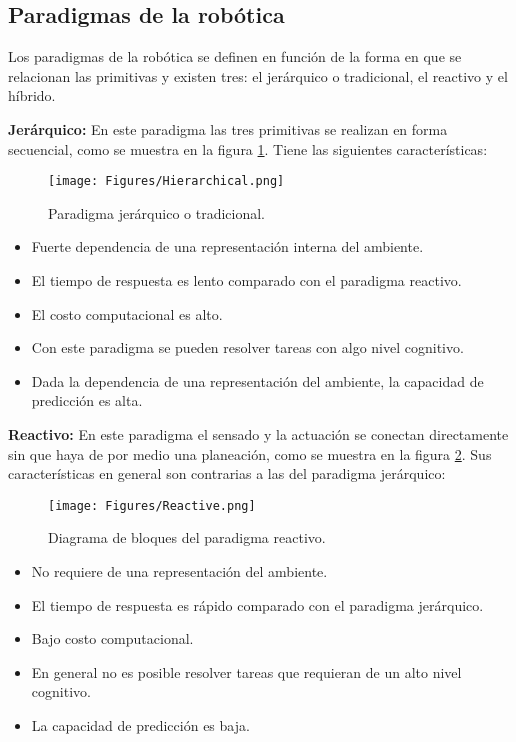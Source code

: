 \documentclass[a4paper]{article}
\begin{document}
\subsection{Paradigmas de la robótica}
Los paradigmas de la robótica se definen en función de la forma en que se relacionan las primitivas y existen tres: el jerárquico o tradicional, el reactivo y el híbrido. 

\textbf{Jerárquico:} En este paradigma las tres primitivas se realizan en forma secuencial, como se muestra en la figura  \ref{fig:ParadigmHierarchical}. Tiene las siguientes características:
\begin{figure}
  \centering
  \texttt{[image: Figures/Hierarchical.png]}
  \caption{Paradigma jerárquico o tradicional.}
  \label{fig:ParadigmHierarchical}
\end{figure}
\begin{itemize}
\item Fuerte dependencia de una representación interna del ambiente. 
\item El tiempo de respuesta es lento comparado con el paradigma reactivo. 
\item El costo computacional es alto.
\item Con este paradigma se pueden resolver tareas con algo nivel cognitivo.
\item Dada la dependencia de una representación del ambiente, la capacidad de predicción es alta.
\end{itemize}

\textbf{Reactivo:} En este paradigma el sensado y la actuación se conectan directamente sin que haya de por medio una planeación, como se muestra en la figura \ref{fig:ParadigmReactive}. Sus características en general son contrarias a las del paradigma jerárquico:
\begin{figure}
  \centering
  \texttt{[image: Figures/Reactive.png]}
  \caption{Diagrama de bloques del paradigma reactivo. }
  \label{fig:ParadigmReactive}
\end{figure}
\begin{itemize}
\item No requiere de una representación del ambiente.
\item El tiempo de respuesta es rápido comparado con el paradigma jerárquico.
\item Bajo costo computacional.
\item En general no es posible resolver tareas que requieran de un alto nivel cognitivo.
\item La capacidad de predicción es baja. 
\end{itemize}
\end{document}
